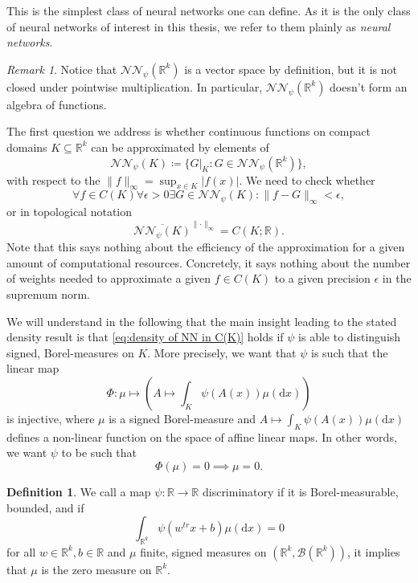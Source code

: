 \documentclass[11pt,a4paper,twoside,openany]{report}
\numberwithin{equation}{section}
\newcommand{\diff}{\mathrm{d}}
\theoremstyle{plain} %
\theoremstyle{definition} %
\newtheorem{definition}[theorem]{Definition}
\theoremstyle{remark} %
\newtheorem{remark}[theorem]{Remark}
\begin{document}
This is the simplest class of neural networks one can define. As it is the only class of neural networks of interest in this thesis, we refer to them plainly as \textit{neural networks}. 
\begin{remark}\label{rem:NN don't form algebra}
    Notice that \(\mathcal{NN}_{\psi}(\mathbb{R}^k)\) is a vector space by definition, but it is not closed under pointwise multiplication. In particular, \(\mathcal{NN}_{\psi}(\mathbb{R}^k)\) doesn't form an algebra of functions.
\end{remark}
The first question we address is whether continuous functions on compact domains \(K\subseteq\mathbb{R}^k\) can be approximated by elements of 
\begin{equation*}
    \mathcal{NN}_{\psi}(K)\coloneqq \big\{G|_K:G\in\mathcal{NN}_{\psi}(\mathbb{R}^k)\big\},
\end{equation*}
with respect to the \(\lVert f\rVert_{\infty}=\sup_{x\in K}|f(x)|\). We need to check whether
\begin{equation*}
    \forall{f}\in C(K)\forall\epsilon>0\exists G\in\mathcal{NN}_{\psi}(K):\lVert f-G\rVert_{\infty}<\epsilon,
\end{equation*}
or in topological notation
\begin{equation*}\label{eq:density of NN in C(K)}
    \overline{\mathcal{NN}_{\psi}(K)}^{\lVert\cdot\rVert_\infty}=C(K;\mathbb{R}).
\end{equation*}
Note that this says nothing about the efficiency of the approximation for a given amount of computational resources. Concretely, it says nothing about the number of weights needed to approximate a given \(f\in C(K)\) to a given precision \(\epsilon\) in the supremum norm. 



We will understand in the following that the main insight leading to the stated density result is that \eqref{eq:density of NN in C(K)} holds if \(\psi\) is able to distinguish signed, Borel-measures on \(K\). More precisely, we want that \(\psi\) is such that the linear map
\begin{equation*}
    \Phi:\mu\mapsto( A\mapsto\int_{K}\psi(A(x))\mu(\diff x))
\end{equation*}
is injective, 
where \(\mu\) is a signed Borel-measure and \(A\mapsto\int_{K}\psi(A(x))\mu(\diff x)\) defines a non-linear function on the space of affine linear maps. In other words, we want \(\psi\) to be such that 
\begin{equation*}
    \Phi(\mu)=0\implies\mu =0. 
\end{equation*} 
\begin{definition}\label{def:discriminatory maps over reals}
    We call a map \(\psi:\mathbb{R}\to\mathbb{R}\) discriminatory if it is Borel-measurable, bounded, and if
    \begin{equation}\label{eq:discriminatory maps over reals}
        \int_{\mathbb{R}^k}\psi(w^{tr}x+b)\mu(\diff x)=0
    \end{equation}
    for all \(w\in\mathbb{R}^k,b\in\mathbb{R}\) and \(\mu\) finite, signed measures on \((\mathbb{R}^k,\mathcal{B}(\mathbb{R}^k))\), it implies that \(\mu\) is the zero measure on \(\mathbb{R}^k\).
\end{definition}
\end{document}
